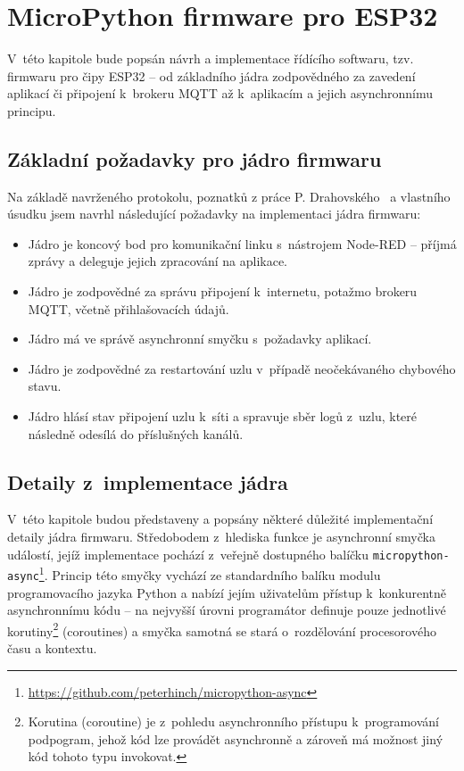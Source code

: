 \chapter{MicroPython firmware pro ESP32}
\label{ch:firmware}

V~této kapitole bude popsán návrh a implementace řídícího softwaru, tzv. firmwaru pro čipy ESP32 -- od základního
jádra zodpovědného za zavedení aplikací či připojení k~brokeru MQTT až k~aplikacím a jejich asynchronnímu principu.

\section{Základní požadavky pro jádro firmwaru}\label{sec:základní-požadavky-pro-jádro}
Na základě navrženého protokolu, poznatků z práce P. Drahovského~\cite{DrahovskyPeter2017RIun} a vlastního úsudku jsem
navrhl následující požadavky na implementaci jádra firmwaru:

\begin{itemize}
    \item Jádro je koncový bod pro komunikační linku s~nástrojem Node-RED -- příjmá zprávy a deleguje jejich
    zpracování na aplikace.
    \item Jádro je zodpovědné za správu připojení k~internetu, potažmo brokeru MQTT, včetně přihlašovacích údajů.
    \item Jádro má ve správě asynchronní smyčku s~požadavky aplikací.
    \item Jádro je zodpovědné za restartování uzlu v~případě neočekávaného chybového stavu.
    \item Jádro hlásí stav připojení uzlu k~síti a spravuje sběr logů z~uzlu, které následně odesílá do příslušných
    kanálů.
\end{itemize}

\section{Detaily z~implementace jádra}\label{sec:detaily-z-implementace-jadra}
V~této kapitole budou představeny a popsány některé důležité implementační detaily jádra firmwaru.
Středobodem z~hlediska funkce je asynchronní smyčka událostí, jejíž implementace pochází z~veřejně dostupného balíčku
\texttt{micropython-async}\footnote{\url{https://github.com/peterhinch/micropython-async}}.
Princip této smyčky vychází ze standardního balíku modulu  programovacího jazyka Python a nabízí
jejím uživatelům přístup k~konkurentně asynchronnímu kódu -- na nejvyšší úrovni programátor definuje pouze jednotlivé
korutiny\footnote{Korutina (coroutine) je z~pohledu asynchronního přístupu k~programování podpogram,
jehož kód lze provádět asynchronně a zároveň má možnost jiný kód tohoto typu invokovat.} (coroutines) a smyčka samotná
se stará o~rozdělování procesorového času a kontextu.

